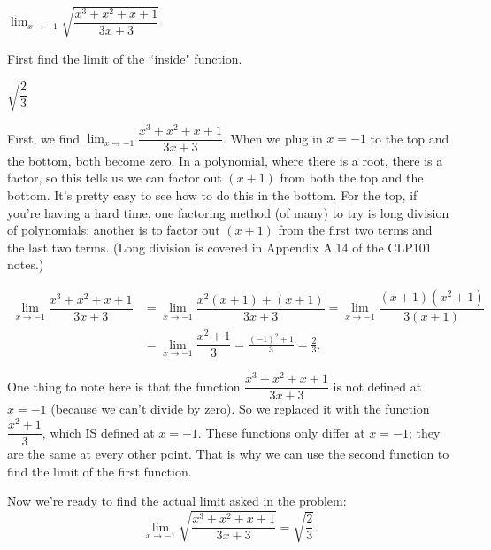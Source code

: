 \begin{Mquestion}
$\displaystyle\lim_{x \rightarrow -1}\sqrt{\dfrac{x^3+x^2+x+1}{3x+3}}$
\end{Mquestion}
\begin{hint} First find the limit of the ``inside" function.
\end{hint}
\begin{answer} $\sqrt{\dfrac{2}{3}}$
\end{answer}
\begin{solution} First, we find $\displaystyle\lim_{x \rightarrow -1}\dfrac{x^3+x^2+x+1}{3x+3}$. When we plug in $x=-1$ to the top and the bottom, both become zero. In a polynomial, where there is a root, there is a factor, so this tells us we can factor out $(x+1)$ from both the top and the bottom. It's pretty easy to see how to do this in the bottom. For the top, if you're having a hard time, one factoring method (of many) to try is long division of polynomials; another is to factor out $(x+1)$ from the first two terms and the last two terms. (Long division is covered in Appendix A.14 of the CLP101 notes.)

\begin{align*}
\displaystyle\lim_{x \rightarrow -1}\dfrac{x^3+x^2+x+1}{3x+3}&=
\displaystyle\lim_{x \rightarrow -1}\dfrac{x^2(x+1)+(x+1)}{3x+3}
=\displaystyle\lim_{x \rightarrow -1}\dfrac{(x+1)(x^2+1)}{3(x+1)}\\
&=
\displaystyle\lim_{x \rightarrow -1}\dfrac{x^2+1}{3}=\frac{(-1)^2+1}{3}=\frac{2}{3}.
\end{align*}

One thing to note here is that the function $\dfrac{x^3+x^2+x+1}{3x+3}$ is not defined at  $x=-1$ (because we can't divide by zero). So we replaced it with the function
$\dfrac{x^2+1}{3}$, which IS defined at $x=-1$. These functions only differ at $x=-1$; they are the same at every other point. That is why we can use the second function to find the limit of the first function.

Now we're ready to find the actual limit asked in the problem:
\[\displaystyle\lim_{x \rightarrow -1}\sqrt{\dfrac{x^3+x^2+x+1}{3x+3}}=
\sqrt{\dfrac{2}{3}}.\]
\end{solution}

